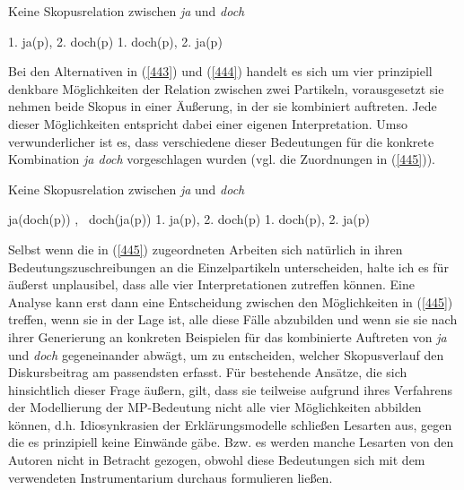\begin{exe}
	\ex\label{444} Keine Skopusrelation zwischen \textit{ja} und \textit{doch}\\[-1em]
	\begin{xlist}
		\ex\label{443a} 1. ja(p), 2. doch(p)	
 		\ex\label{443b}	1. doch(p), 2. ja(p)		
 	\end{xlist}	
\end{exe}
Bei den Alternativen in (\ref{443}) und (\ref{444}) handelt es sich um vier prinzipiell denkbare Möglichkeiten der Relation zwischen zwei Partikeln, vorausgesetzt sie nehmen beide Skopus in einer Äußerung, in der sie kombiniert auftreten. Jede dieser Möglichkeiten entspricht dabei einer eigenen Interpretation. Umso verwunderlicher ist es, dass verschiedene dieser Bedeutungen für die konkrete Kombination \textit{ja doch} vorgeschlagen wurden (vgl. die Zuordnungen in (\ref{445})).

\begin{exe}
	\ex\label{445} Keine Skopusrelation zwischen \textit{ja} und \textit{doch}\\[-1em]
	\begin{xlist}
		\ex\label{445a} ja(doch(p))
		\hfill\hbox {\citet{Ormelius-Sandblom1997}, \citet{Rinas2007}}	
 		\ex\label{445b}	doch(ja(p))	
 		\hfill\hbox {\citet{Lindner1991}}	
 		\ex\label{445c} 1. ja(p), 2. doch(p)
 		\hfill\hbox {\citet{Thurmair1989}}		
 		\ex\label{445d}	1. doch(p), 2. ja(p) 	
 		\hfill\hbox {\citet{Doherty1985}}		
 	\end{xlist}	
\end{exe}									
Selbst wenn die in (\ref{445}) zugeordneten Arbeiten sich natürlich in ihren Bedeutungszuschreibungen an die Einzelpartikeln unterscheiden, halte ich es für äußerst unplausibel, dass alle vier Interpretationen zutreffen können. Eine Analyse kann erst dann eine Entscheidung zwischen den Möglichkeiten in (\ref{445}) treffen, wenn sie in der Lage ist, alle diese Fälle abzubilden und wenn sie sie nach ihrer Gene\-rierung an konkreten Beispielen für das kombinierte Auftreten von \textit{ja} und \textit{doch} gegeneinander abwägt, um zu entscheiden, welcher Skopusverlauf den Diskursbeitrag am passendsten erfasst. Für bestehende Ansätze, die sich hinsichtlich dieser Frage äußern, gilt, dass sie teilweise aufgrund ihres Verfahrens der Model\-lierung der MP-Bedeutung nicht alle vier Möglichkeiten abbilden können, d.h. I\-diosynkrasien der Erklärungsmodelle schließen Lesarten aus, gegen die es prinzi\-piell keine Einwände gäbe. Bzw. es werden manche Lesarten von den Autoren nicht in Betracht gezogen, obwohl diese Bedeutungen sich mit dem verwendeten Instrumentarium durchaus formulieren ließen. 

